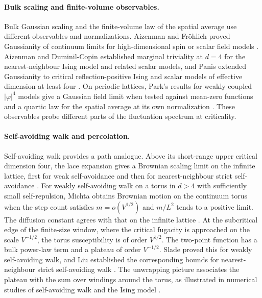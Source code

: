 \documentclass[11pt]{article}
\theoremstyle{definition}
\begin{document}
\paragraph{Bulk scaling and finite-volume observables.}
Bulk Gaussian scaling and the finite-volume law of the spatial average
use different observables and normalizations. Aizenman and Fr\"ohlich proved
Gaussianity of continuum limits for high-dimensional spin or scalar
field models \cite{Aizenman1982,Frohlich1982}. Aizenman and
Duminil-Copin established marginal triviality at $d=4$ for the
nearest-neighbour Ising model and related scalar models, and Panis
extended Gaussianity to critical reflection-positive Ising and scalar
models of effective dimension at least four
\cite{AizenmanDuminilCopin2021,Panis2026}. On periodic lattices, Park's
results for weakly coupled $|\varphi|^4$ models give a Gaussian field
limit when tested against mean-zero functions and a quartic law for the
spatial average at its own normalization \cite[Theorem~1.9]{TorusFSS}.
These observables probe different parts of the fluctuation spectrum at
criticality.

\paragraph{Self-avoiding walk and percolation.}
Self-avoiding walk provides a path analogue. Above its
short-range upper critical dimension four, the lace expansion gives a
Brownian scaling limit on the infinite lattice, first for weak
self-avoidance and then for nearest-neighbour strict self-avoidance
\cite{BrydgesSpencer1985,HaraSlade1991}. For weakly self-avoiding walk
on a torus in \(d>4\) with sufficiently small self-repulsion, Michta
obtains Brownian motion on the continuum torus when the step count
satisfies \(m=o(V^{1/2})\) and \(m/L^2\) tends to a positive limit.
The diffusion constant agrees with that on the infinite lattice
\cite{MichtaTorWalk}. At the subcritical edge of the finite-size window,
where the critical fugacity is approached on the scale $V^{-1/2}$,
the torus susceptibility is of order $V^{1/2}$. The two-point function
has a bulk power-law term and a plateau of order $V^{-1/2}$.
Slade proved this for weakly self-avoiding walk, and Liu established
the corresponding bounds for nearest-neighbour strict self-avoiding
walk \cite{SladeWSAWPlateau,LiuSAWPlateau}. The unwrapping picture associates the plateau with the sum over
windings around the torus, as illustrated in numerical studies of
self-avoiding walk and the Ising model \cite{GrimmEtAl2017}.
\end{document}
